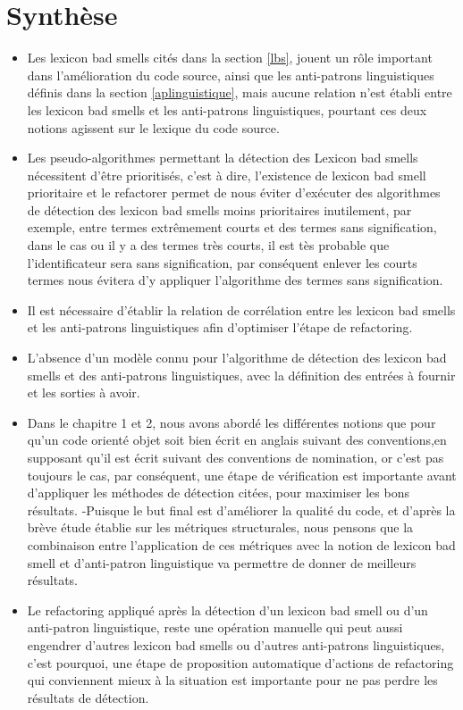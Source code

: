 \section{Synthèse}
\begin{itemize}
    \item Les lexicon bad smells cités dans la section \ref{lbs}, jouent un rôle important dans l'amélioration du code source, ainsi que les anti-patrons linguistiques définis dans la section \ref{aplinguistique}, mais aucune relation n'est établi entre les lexicon bad smells et les anti-patrons linguistiques, pourtant ces deux notions agissent sur le lexique du code source.
    \item Les pseudo-algorithmes permettant la détection des Lexicon bad smells nécessitent d'être prioritisés, c'est à dire, l'existence de lexicon bad smell prioritaire et le refactorer permet de nous éviter d'exécuter des algorithmes de détection des lexicon bad smells moins prioritaires inutilement, par exemple, entre termes extrêmement courts et des termes sans signification, dans le cas ou il y a des termes très courts, il est tès probable que l'identificateur sera sans signification, par conséquent enlever les courts termes nous évitera d'y appliquer l'algorithme des termes sans signification.
  \item Il est nécessaire d'établir la relation de corrélation entre les lexicon bad smells et les anti-patrons linguistiques afin d'optimiser l'étape de refactoring.
    \item L'absence d'un modèle connu pour l'algorithme de détection des lexicon bad smells et des anti-patrons linguistiques, avec la définition des entrées à fournir et les sorties à avoir.
    \item Dans le chapitre 1 et 2, nous avons abordé les différentes notions que pour qu'un code orienté objet soit bien écrit en anglais suivant des conventions,en supposant qu'il est écrit suivant des conventions de nomination, or c'est pas toujours le cas, par conséquent, une étape de vérification est importante avant d'appliquer les méthodes de détection citées, pour maximiser les bons résultats.
-Puisque le but final est d'améliorer la qualité du code, et d'après la brève étude établie sur les métriques structurales, nous pensons que la combinaison entre l'application de ces métriques avec la notion de lexicon bad smell et d'anti-patron linguistique va permettre de donner de meilleurs résultats.
\item Le refactoring appliqué après la détection d'un lexicon bad smell ou d'un anti-patron linguistique, reste une opération manuelle qui peut aussi engendrer d'autres lexicon bad smells ou d'autres anti-patrons linguistiques, c'est pourquoi, une étape de proposition automatique d'actions de refactoring qui conviennent mieux à la situation est importante pour ne pas perdre les résultats de détection.
\end{itemize}
